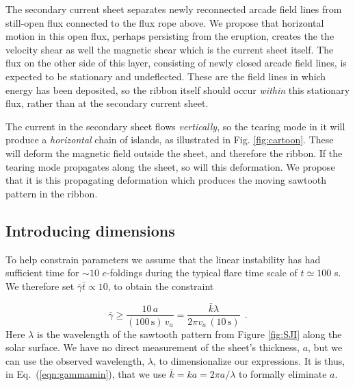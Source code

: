 	The secondary current sheet separates newly reconnected arcade field lines from still-open flux connected to the flux rope above.  We propose that horizontal motion in this open flux, perhaps persisting from the eruption,  creates the the velocity shear as well the magnetic shear which is the current sheet itself.  The flux on the other side of this layer, consisting of newly closed arcade field lines, is expected to be stationary and undeflected.  These are the field lines in which energy has been deposited, so the ribbon itself should occur {\em within} this stationary flux, rather than at the secondary current sheet.
	
	The current in the secondary sheet flows {\em vertically}, so the tearing mode in it will produce a {\em horizontal} chain of islands, as illustrated in Fig. \ref{fig:cartoon}.  These will deform the magnetic field outside the sheet, and therefore the ribbon.  If the tearing mode propagates along the sheet, so will this deformation.   We propose that it is this propagating deformation which produces the moving sawtooth pattern in the ribbon.
	
	  
	
	
\subsection{Introducing dimensions}
	
	 To help constrain parameters we assume that the linear instability has had sufficient time for $\sim10$ $e$-foldings during the typical flare time scale of $t\simeq100$ s.  We therefore set $\bar{\gamma} \bar{t} \propto 10$, to obtain the constraint
	
	\begin{equation}
	\label{eqn:gammamin}
	\bar{\gamma} \geq \frac{10\,a}{(100\, \mathrm{s})\, v_a}= \frac{\bar{k} \lambda}{2 \pi v_a\, (10\,\mathrm{s})}~~.
	\end{equation}
Here $\lambda$ is the wavelength of the sawtooth pattern from Figure \ref{fig:SJI} along the solar surface.  We have no direct measurement of the sheet's thickness, $a$, but we can use the observed wavelength, $\lambda$, to dimensionalize our expressions.  It is thus, in Eq.\ (\ref{eqn:gammamin}), that we use $\bar{k} = ka = 2\pi a/\lambda$ to formally eliminate $a$. 

